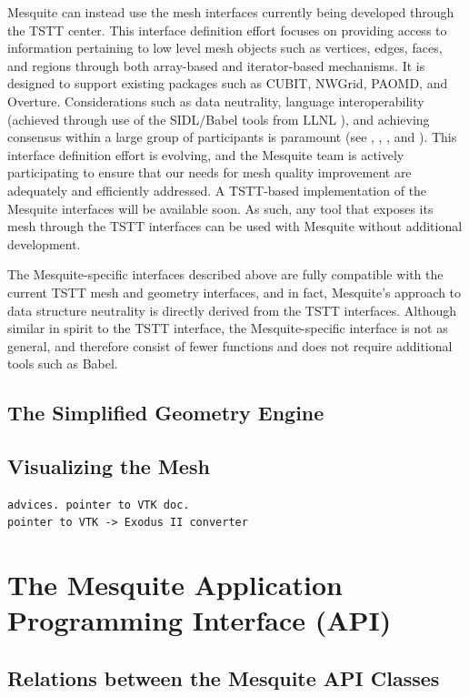 \documentclass[letter]{report}
\begin{document}
Mesquite can instead use the mesh interfaces currently
being developed through the TSTT center.  This interface definition
effort focuses on providing access to information pertaining to low
level mesh objects such as vertices, edges, faces, and regions through
both array-based and iterator-based mechanisms.  It is designed to
support existing packages such as CUBIT, NWGrid, PAOMD, and Overture.
Considerations such as data neutrality, language interoperability
(achieved through use of the SIDL/Babel tools from LLNL \cite{babel}),
and achieving consensus within a large group of participants is
paramount (see \cite{Cubit-website}, \cite{overture}, \cite{aomd-imr},
and \cite{NWGrid-website}).  This interface definition effort is
evolving, and the Mesquite team is actively participating to ensure
that our needs for mesh quality improvement are adequately and
efficiently addressed.  A TSTT-based implementation of the Mesquite
interfaces will be available soon.  As such, any tool that exposes its
mesh through the TSTT interfaces can be used with Mesquite without
additional development.

The Mesquite-specific interfaces described above are fully compatible
with the current TSTT mesh and geometry interfaces, and in fact,
Mesquite's approach to data structure neutrality is directly derived
from the TSTT interfaces.  Although similar in spirit to the TSTT
interface, the Mesquite-specific interface is not as general, and 
therefore consist of fewer
functions and does not require additional tools such as Babel.

\section{The Simplified Geometry Engine}
\label{sec:geometry}

\section{Visualizing the Mesh}

\begin{verbatim}
advices. pointer to VTK doc. 
pointer to VTK -> Exodus II converter
\end{verbatim}

\chapter{The Mesquite Application Programming Interface (API)}

\section{Relations between the Mesquite API Classes}
\end{document}
